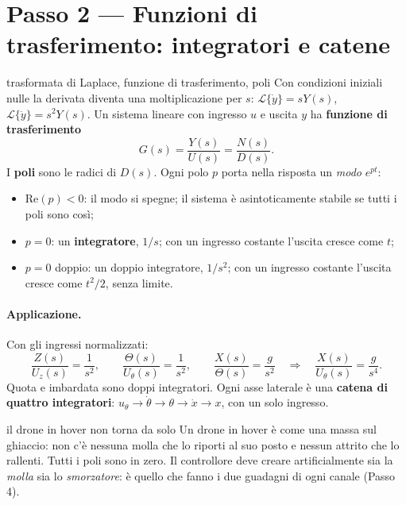 \documentclass[11pt,a4paper]{article}
\begin{document}
\section{Passo 2 --- Funzioni di trasferimento: integratori e catene}

\begin{teoria}{trasformata di Laplace, funzione di trasferimento, poli}
Con condizioni iniziali nulle la derivata diventa una moltiplicazione per $s$: $\mathcal{L}\{\dot y\} = sY(s)$, $\mathcal{L}\{\ddot y\} = s^2 Y(s)$. Un sistema lineare con ingresso $u$ e uscita $y$ ha \textbf{funzione di trasferimento}
\[
G(s) = \frac{Y(s)}{U(s)} = \frac{N(s)}{D(s)} .
\]
I \textbf{poli} sono le radici di $D(s)$. Ogni polo $p$ porta nella risposta un \emph{modo} $e^{pt}$:
\begin{itemize}
  \item $\mathrm{Re}(p) < 0$: il modo si spegne; il sistema è asintoticamente stabile se tutti i poli sono così;
  \item $p = 0$: un \textbf{integratore}, $1/s$; con un ingresso costante l'uscita cresce come $t$;
  \item $p = 0$ doppio: un doppio integratore, $1/s^2$; con un ingresso costante l'uscita cresce come $t^2/2$, senza limite.
\end{itemize}
\end{teoria}

\paragraph{Applicazione.} Con gli ingressi normalizzati:
\[
\frac{Z(s)}{U_z(s)} = \frac{1}{s^2}, \qquad \frac{\Theta(s)}{U_\theta(s)} = \frac{1}{s^2}, \qquad \frac{X(s)}{\Theta(s)} = \frac{g}{s^2}
\quad\Rightarrow\quad \frac{X(s)}{U_\theta(s)} = \frac{g}{s^4}.
\]
Quota e imbardata sono doppi integratori. Ogni asse laterale è una \textbf{catena di quattro integratori}: $u_\theta \to \dot\theta \to \theta \to \dot x \to x$, con un solo ingresso.

\begin{fisica}{il drone in hover non torna da solo}
Un drone in hover è come una massa sul ghiaccio: non c'è nessuna molla che lo riporti al suo posto e nessun attrito che lo rallenti. Tutti i poli sono in zero. Il controllore deve creare artificialmente sia la \emph{molla} sia lo \emph{smorzatore}: è quello che fanno i due guadagni di ogni canale (Passo 4).
\end{fisica}
\end{document}
